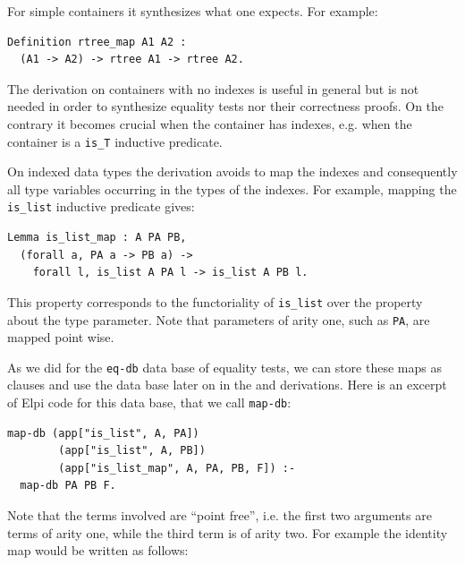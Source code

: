 \documentclass[sigplan,10pt,review]{acmart}\settopmatter{printfolios=true,printccs=false,printacmref=false}
\newcommand{\derive}[1]{\keys{#1}}
\begin{document}
For simple containers it synthesizes what one expects. For example:

\begin{minipage}{\textwidth}\begin{lstlisting}
Definition rtree_map A1 A2 :
  (A1 -> A2) -> rtree A1 -> rtree A2.
\end{lstlisting}\end{minipage}

The derivation on containers with no indexes is useful in general
but is not needed in order
to synthesize equality tests nor their correctness proofs.
On the contrary it becomes crucial when the container has indexes,
e.g. when the container is a \lstinline+is_T+ inductive predicate.

On indexed data types the derivation avoids to map the indexes and
consequently all type variables occurring in the types of the indexes.
For example, mapping the \lstinline+is_list+ inductive predicate gives:

\begin{minipage}{\textwidth}\begin{lstlisting}
Lemma is_list_map : A PA PB,
  (forall a, PA a -> PB a) ->
    forall l, is_list A PA l -> is_list A PB l.
\end{lstlisting}\end{minipage}

\noindent
This property corresponds to the functoriality of \lstinline+is_list+
over the property about the type parameter. Note that parameters of
arity one, such as \lstinline+PA+, are mapped point wise.

As we did for the \lstinline+eq-db+ data base of equality tests, we
can store these maps as clauses and use the data base later on in the
\derive{induction} and \derive{eqcorrect} derivations.
Here is an excerpt of Elpi code for this data base, that we call
\lstinline+map-db+:

\begin{minipage}{\textwidth}\begin{lstlisting}[]
map-db (app["is_list", A, PA])
        (app["is_list", A, PB])
        (app["is_list_map", A, PA, PB, F]) :-
  map-db PA PB F.
\end{lstlisting}\end{minipage}

\noindent
Note that the terms involved are ``point free'', i.e.
the first two arguments are terms of arity one, while
the third term is of arity two. For example the identity
map would be written as follows:
\end{document}
